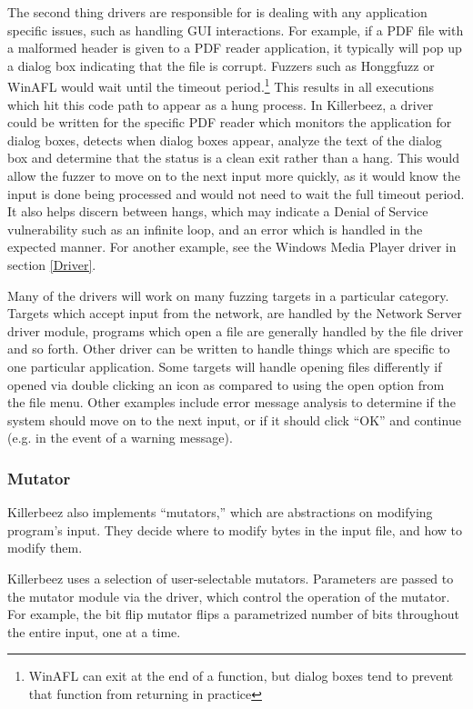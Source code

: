 The second thing drivers are responsible for is dealing with any application
specific issues, such as handling GUI interactions.  For example, if a PDF file
with a malformed header is given to a PDF reader application, it typically will
pop up a dialog box indicating that the file is corrupt. Fuzzers such as
Honggfuzz or WinAFL would wait until the timeout period.\footnote{WinAFL can
exit at the end of a function, but dialog boxes tend to prevent that function
from returning in practice} This results in all executions which hit this code
path to appear as a hung process.  In Killerbeez, a driver could be written for
the specific PDF reader which monitors the application for dialog boxes,
detects when dialog boxes appear, analyze the text of the dialog box and
determine that the status is a clean exit rather than a hang.  This would allow
the fuzzer to move on to the next input more quickly, as it would know the
input is done being processed and would not need to wait the full timeout
period.  It also helps discern between hangs, which may indicate a Denial of
Service vulnerability such as an infinite loop, and an error which is handled
in the expected manner. For another example, see the Windows Media Player
driver in section \ref{Driver}.

Many of the drivers will work on many fuzzing targets in a particular category.
Targets which accept input from the network, are handled by the Network Server
driver module, programs which open a file are generally handled by the file
driver and so forth.  Other driver can be written to handle things which are
specific to one particular application.  Some targets will handle opening files
differently if opened via double clicking an icon as compared to using the open
option from the file menu. Other examples include error message analysis to
determine if the system should move on to the next input, or if it should click
``OK'' and continue (e.g. in the event of a warning message).

\subsubsection{Mutator} \label{Mutator Overview}
Killerbeez also implements ``mutators,'' which are abstractions on modifying
program's input. They decide where to modify bytes in the input file, and how
to modify them.

Killerbeez uses a selection of user-selectable mutators. Parameters are passed
to the mutator module via the driver, which control the operation of the
mutator. For example, the bit flip mutator flips a parametrized number of bits
throughout the entire input, one at a time.

